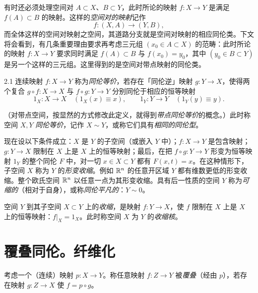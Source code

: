有时还必须处理空间对 $A\subset X$、$B\subset Y$，此时所论的映射 $f:X\to Y$ 是满足 $f(A)\subset B$ 的映射。这样的\emph{空间对的映射}记作
\[
  f:(X,A)\to(Y,B),
\]
而全体这样的空间对映射之空间，其道路分支就是空间对映射的相应同伦类。下文将会看到，有几条重要理由要求再考虑三元组 $(x_0\in A\subset X)$ 的范畴：此时所论的映射 $f:X\to Y$ 要求同时满足 $f(A)\subset B$ 与 $f(x_0)=y_0$，其中 $(y_0\in B\subset Y)$ 是另一个这样的三元组。这里得到的是空间对带点映射的同伦类。

\begin{definition*}{2.1}
连续映射 $f:X\to Y$ 称为\emph{同伦等价}，若存在「同伦逆」映射 $g:Y\to X$，使得两个复合 $g\circ f:X\to X$ 与 $f\circ g:Y\to Y$ 分别同伦于相应的恒等映射
\[
  1_X:X\to X\quad(1_X(x)\equiv x),\qquad 1_Y:Y\to Y\quad(1_Y(y)\equiv y).
\]
\end{definition*}
（对带点空间，按显然的方式修改此定义，就得到\emph{带点同伦等价}的概念。）此时称空间 $X,Y$ \emph{同伦等价}，记作 $X\sim Y$，或称它们具有\emph{相同的同伦型}。

现在设以下条件成立：$X$ 是 $Y$ 的子空间（或嵌入 $Y$ 中）；$f:X\to Y$ 是包含映射；$g:Y\to X$ 限制在 $X$ 上是 $X$ 上的恒等映射；最后，在把 $f\circ g:Y\to Y$ 形变为恒等映射 $1_Y$ 的整个同伦 $F$ 中，对一切 $x\in X\subset Y$ 都有 $F(x,t)=x$。在这种情形下，子空间 $X$ 称为 $Y$ 的\emph{形变收缩}。例如 $\mathbb{R}^n$ 的任意开区域 $Y$ 都有维数更低的形变收缩。整个欧氏空间 $\mathbb{R}^n$ 以任意一点为其形变收缩。具有后一性质的空间 $Y$ 称为\emph{可缩的}（相对于自身），或称\emph{同伦平凡的}：$Y\sim 0$。

空间 $Y$ 到其子空间 $X\subset Y$ 上的\emph{收缩}，是映射 $f:Y\to X$，使 $f$ 限制在 $X$ 上是 $X$ 上的恒等映射：$f|_X=1_X$。此时称空间 $X$ 为 $Y$ 的\emph{收缩核}。

\section{覆叠同伦。纤维化}


考虑一个（连续）映射 $p:X\to Y$。称任意映射 $f:Z\to Y$ 被\emph{覆叠}（经由 $p$），若存在映射 $g:Z\to X$ 使 $f=p\circ g$。

